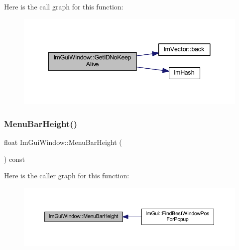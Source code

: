 Here is the call graph for this function\+:
\nopagebreak
\begin{figure}[H]
\begin{center}
\leavevmode
\includegraphics[width=341pt]{struct_im_gui_window_aea0ace882f6e8ec9d6825d808c975203_cgraph}
\end{center}
\end{figure}
\mbox{\label{struct_im_gui_window_acfb8bdad2e3ea6102589813ae32d0364}} 
\subsubsection{\texorpdfstring{Menu\+Bar\+Height()}{MenuBarHeight()}}
{\footnotesize\ttfamily float Im\+Gui\+Window\+::\+Menu\+Bar\+Height (\begin{DoxyParamCaption}{ }\end{DoxyParamCaption}) const\hspace{0.3cm}{\ttfamily [inline]}}

Here is the caller graph for this function\+:
\nopagebreak
\begin{figure}[H]
\begin{center}
\leavevmode
\includegraphics[width=350pt]{struct_im_gui_window_acfb8bdad2e3ea6102589813ae32d0364_icgraph}
\end{center}
\end{figure}
\mbox{\label{struct_im_gui_window_a59df76c1445aaaf0b43456c83c1a88e5}} 
